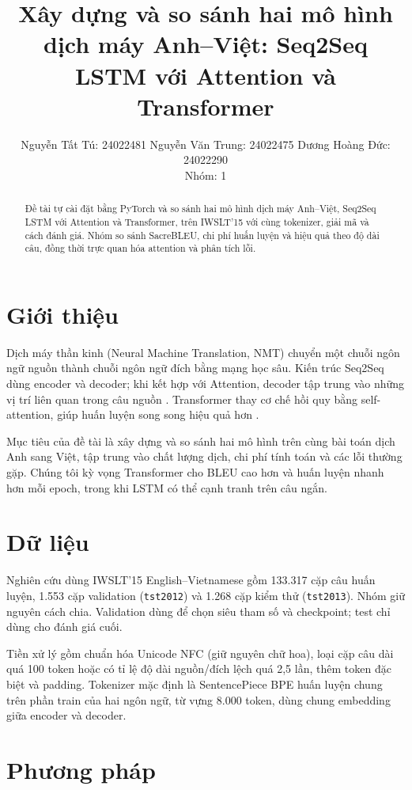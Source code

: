 \documentclass[11pt,a4paper]{article}
\title{
Xây dựng và so sánh hai mô hình dịch máy Anh--Việt:
Seq2Seq LSTM với Attention và Transformer
}
\author{
Nguyễn Tất Tú: 24022481 \quad
Nguyễn Văn Trung: 24022475 \quad
Dương Hoàng Đức: 24022290 \quad \\
Nhóm: 1
}
\begin{document}
\maketitle

\begin{abstract}
Đề tài tự cài đặt bằng PyTorch và so sánh hai mô hình
dịch máy Anh--Việt, Seq2Seq LSTM với Attention và
Transformer, trên IWSLT'15 với cùng tokenizer, giải mã
và cách đánh giá. Nhóm so sánh SacreBLEU, chi phí huấn
luyện và hiệu quả theo độ dài câu, đồng thời trực quan
hóa attention và phân tích lỗi.
\end{abstract}

\section{Giới thiệu}

Dịch máy thần kinh (Neural Machine Translation,
NMT) chuyển một chuỗi ngôn ngữ nguồn thành chuỗi
ngôn ngữ đích bằng mạng học sâu. Kiến trúc Seq2Seq
dùng encoder và decoder; khi kết hợp với Attention,
decoder tập trung vào những vị trí liên quan trong
câu nguồn \citep{bahdanau2015nmt}. Transformer thay
cơ chế hồi quy bằng self-attention, giúp huấn luyện
song song hiệu quả hơn \citep{vaswani2017attention}.

Mục tiêu của đề tài là xây dựng và so sánh hai mô
hình trên cùng bài toán dịch Anh sang Việt, tập trung
vào chất lượng dịch, chi phí tính toán và các lỗi
thường gặp. Chúng tôi kỳ vọng Transformer cho BLEU
cao hơn và huấn luyện nhanh hơn mỗi epoch, trong khi
LSTM có thể cạnh tranh trên câu ngắn.

\section{Dữ liệu}

Nghiên cứu dùng IWSLT'15 English--Vietnamese
\citep{luong2015iwslt} gồm 133.317 cặp câu huấn luyện,
1.553 cặp validation (\texttt{tst2012}) và 1.268 cặp
kiểm thử (\texttt{tst2013}). Nhóm giữ nguyên cách chia.
Validation dùng để chọn siêu tham số và checkpoint;
test chỉ dùng cho đánh giá cuối.

Tiền xử lý gồm chuẩn hóa Unicode NFC (giữ nguyên chữ
hoa), loại cặp câu dài quá 100 token hoặc có tỉ lệ độ
dài nguồn/đích lệch quá 2,5 lần, thêm token đặc biệt
và padding. Tokenizer mặc định là SentencePiece BPE
huấn luyện chung trên phần train của hai ngôn ngữ, từ
vựng 8.000 token, dùng chung embedding giữa encoder
và decoder.

\section{Phương pháp}
\end{document}
